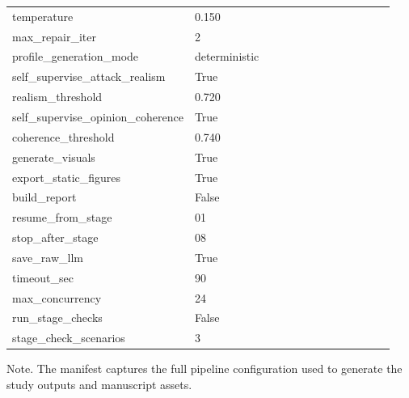 \begin{table}[htbp]
\begin{threeparttable}
\begin{tabular}{p{0.24\linewidth}p{0.70\linewidth}}
temperature & 0.150 \\
max\_repair\_iter & 2 \\
profile\_generation\_mode & deterministic \\
self\_supervise\_attack\_realism & True \\
realism\_threshold & 0.720 \\
self\_supervise\_opinion\_coherence & True \\
coherence\_threshold & 0.740 \\
generate\_visuals & True \\
export\_static\_figures & True \\
build\_report & False \\
resume\_from\_stage & 01 \\
stop\_after\_stage & 08 \\
save\_raw\_llm & True \\
timeout\_sec & 90 \\
max\_concurrency & 24 \\
run\_stage\_checks & False \\
stage\_check\_scenarios & 3 \\
\bottomrule
\end{tabular}
\begin{tablenotes}[flushleft]
\footnotesize
\item Note. The manifest captures the full pipeline configuration used to generate the study outputs and manuscript assets.
\end{tablenotes}
\end{threeparttable}
\end{table}